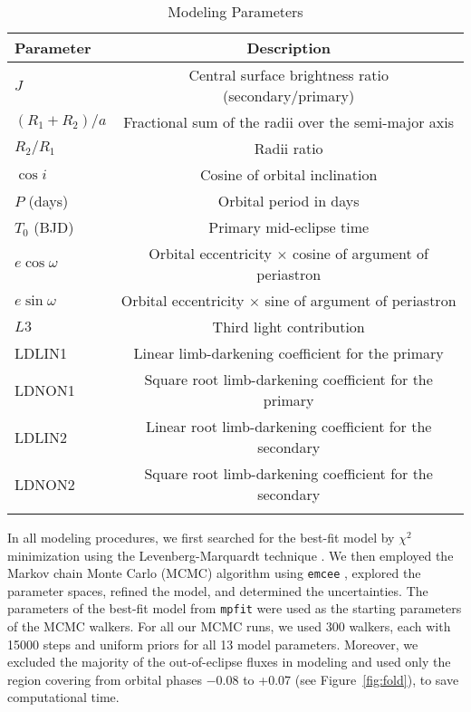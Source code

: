 \documentclass[fleqn,usenatbib]{mnras} %
\begin{document}
\begin{table}
\begin{center}
\caption{Modeling Parameters}
\begin{tabular}{@{}l c}
\hline
Parameter & Description \\
\hline
$J$ & Central surface brightness ratio (secondary/primary)\\
$(R_1 + R_2)/a$ & Fractional sum of the radii over the semi-major axis\\
$R_2/R_1$ & Radii ratio\\
$\cos{i}$ & Cosine of orbital inclination \\
$P$ (days) & Orbital period in days \\
$T_0$ (BJD) & Primary mid-eclipse time \\
$e \cos{\omega}$ & Orbital eccentricity $\times$ cosine of argument of periastron  \\
$e \sin{\omega}$ & Orbital eccentricity $\times$ sine of argument of periastron\\
$L3$ & Third light contribution\\
LDLIN1 & Linear limb-darkening coefficient for the primary\\
LDNON1 & Square root limb-darkening coefficient for the primary\\
LDLIN2 & Linear root limb-darkening coefficient for the secondary\\
LDNON2 & Square root limb-darkening coefficient for the secondary\\
\hline
\label{tab:modelparm}
\end{tabular}
\end{center}

\end{table}

In all modeling procedures, we first searched for the best-fit model by $\chi^2$ minimization using the Levenberg-Marquardt technique \citep[\texttt{mpfit}, ][]{Markwardt2009}. We then employed the Markov chain Monte Carlo (MCMC) algorithm using \texttt{emcee} \citep[][]{Foreman-Mackey2013}, explored the parameter spaces, refined the model, and determined the uncertainties. The parameters of the best-fit model from \texttt{mpfit} were used as the starting parameters of the MCMC walkers. For all our MCMC runs, we used 300 walkers, each with 15000 steps and uniform priors for all 13 model parameters. Moreover, we excluded the majority of the out-of-eclipse fluxes in modeling and used only the region covering from orbital phases $-0.08$ to +0.07 (see Figure~\ref{fig:fold}), to save computational time.
\end{document}
